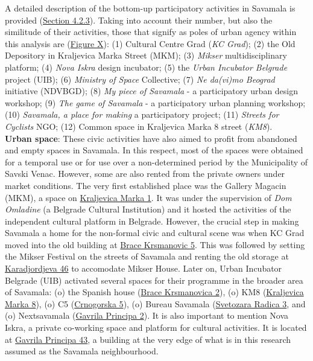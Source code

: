 \documentclass[11pt]{report}
\begin{document}
\begin{itemize}
A detailed description of the bottom-up participatory activities in Savamala is provided (\href{Section 4.2.3}{Section 4.2.3}).
Taking into account their number, but also the similitude of their activities, those that signify as poles of urban agency within this analysis are (\href{Figure X}{Figure X}): 
(1) Cultural Centre Grad (\textit{KC Grad});
(2) the Old Depository in Kraljevica Marka Street (MKM);
(3) \textit{Mikser} multidisciplinary platform;
(4) \textit{Nova Iskra} design incubator;
(5) the \textit{Urban Incubator Belgrade} project (UIB);
(6) \textit{Ministry of Space} Collective;
(7) \textit{Ne da(vi)mo Beograd} initiative (NDVBGD);
(8) \textit{My piece of Savamala} - a participatory urban design workshop;
(9) \textit{The game of Savamala} - a participatory urban planning workshop;
(10) \textit{Savamala, a place for making} a participatory project;
(11) \textit{Streets for Cyclists} NGO;
(12) Common space in Kraljevica Marka 8 street (\textit{KM8}).
\\

\textbf{Urban space}:
These civic activities have also aimed to profit from abandoned and empty spaces in Savamala. In this respect, most of the spaces were obtained for a temporal use or for use over a non-determined period by the Municipality of Savski Venac. However, some are also rented from the private owners under market conditions. The very first established place was the Gallery Magacin (MKM), a space on \underline{Kraljevica Marka 1}.
It was under the supervision of \textit{Dom Omladine} (a Belgrade Cultural Institution) and it hosted the activities of the independent cultural platform in Belgrade.
However, the crucial step in making Savamala a home for the non-formal civic and cultural scene was when KC Grad moved into the old building at  \underline{Brace Krsmanovic 5}.
This was followed by setting the Mikser Festival on the streets of Savamala and renting the old storage at \underline{Karadjordjeva 46} to accomodate Mikser House. Later on, Urban Incubator Belgrade (UIB) activated several spaces for their programme in the broader area of Savamala:
(o) the Spanish house (\underline{Brace Krsmanovica 2}),
(o) KM8 (\underline{Kraljevica Marka 8}),
(o) C5 (\underline{Crnogorska 5}),
(o) Bureau Savamala (\underline{Svetozara Radica 3},
and
(o) Nextsavamala (\underline{Gavrila Principa 2}). 
It is also important to mention Nova Iskra, a private co-working space and platform for cultural activities. It is located at \underline{Gavrila Principa 43}, a building at the very edge of what is in this research assumed as the Savamala neighbourhood.
\end{itemize}
 
\end{document}
